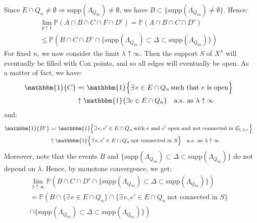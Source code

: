 \documentclass[10pt,a4paper]{amsart}
\theoremstyle{exampstyle}
\theoremstyle{exampnotations}
\begin{document}
Since $E \cap Q_n \neq \emptyset \Rightarrow \text{supp}(\Lambda_{Q_{3n}}) \neq \emptyset$, we have $B \subset \Big\lbrace \text{supp}(\Lambda_{Q_{3n}}) \neq \emptyset \Big\rbrace$. Hence:
\begin{gather*}
    \lim_{p \uparrow 1} \mathbb{P}(A \cap B \cap C \cap F \cap D^{c})  = \mathbb{P}(A \cap B \cap C \cap D^c)  \\ \leq \mathbb{P}\left(B \cap C \cap D^c  \cap \Big\lbrace \text{supp}(\Lambda_{Q_{3n}}) \subset \Delta \subset \text{supp}(\Lambda_{Q_{6n}}) \Big\rbrace \right)
\end{gather*}
For fixed $n$, we now consider the limit $\lambda \uparrow \infty$. Then the support $S$ of $X^{\lambda}$ will eventually be filled with Cox points, and so all edges will eventually be open. As a matter of fact, we have:
\begin{align*}
    \mathbbm{1} \lbrace C \rbrace &\eqqcolon \mathbbm{1} \Big\lbrace \exists \, e \in E\cap Q_n \: \text{such that $e$ is open} \Big\rbrace 
    \\ &\uparrow \mathbbm{1} \lbrace \exists e \in E\cap Q_n \rbrace \quad \text{a.s. as $\lambda \uparrow \infty$}
\end{align*}
and: \begin{align*}
     \mathbbm{1} \lbrace D^c \rbrace &\eqqcolon \mathbbm{1} \Big\lbrace \exists \, e,e' \in E\cap Q_n \: \text{with $e$ and $e'$ open and not connected in } \mathcal{G}_{1,\lambda,r}  \Big\rbrace 
     \\ &\uparrow \mathbbm{1} \Big\lbrace \exists \, e,e' \in E\cap Q_n \: \text{not connected in } S  \Big\rbrace \quad \text{a.s. as $\lambda \uparrow \infty$}
\end{align*}
Moreover, note that the events $B$ and $\Big\lbrace \text{supp}(\Lambda_{Q_{3n}}) \subset \Delta \subset \text{supp}(\Lambda_{Q_{6n}}) \Big\rbrace$ do not depend on $\lambda$. Hence, by monotone convergence, we get:
\begin{gather*}
    \lim_{\lambda \uparrow \infty} \mathbb{P}\left(B \cap C \cap D^c  \cap \Big\lbrace \text{supp}(\Lambda_{Q_{3n}}) \subset \Delta \subset \text{supp}(\Lambda_{Q_{6n}}) \Big\rbrace \right) 
    \\ = \mathbb{P}\left(B \cap \Big\lbrace \exists \, e \in E \cap Q_n \Big\rbrace \cap \Big\lbrace \exists \, e,e' \in E\cap Q_n \: \text{not connected in } S  \Big\rbrace \right. \\ \left. \cap \Big\lbrace \text{supp}(\Lambda_{Q_{3n}}) \subset \Delta \subset \text{supp}(\Lambda_{Q_{6n}}) \Big\rbrace  \right)
\end{gather*}
\end{document}
